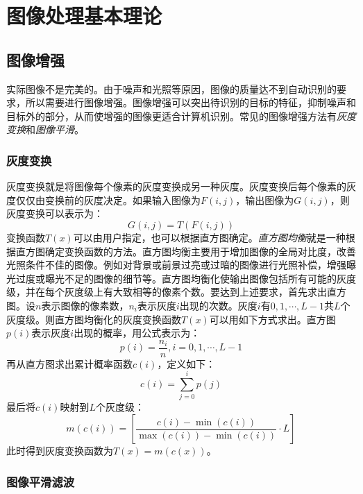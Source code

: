 
\chapter{图像处理基本理论}

\section{图像增强}

实际图像不是完美的。由于噪声和光照等原因，图像的质量达不到自动识别的要求，所以需要进行图像增强。图像增强可以突出待识别的目标的特征，抑制噪声和目标外的部分，从而使增强的图像更适合计算机识别。常见的图像增强方法有\emph{灰度变换}和\emph{图像平滑}。

\subsection{灰度变换}

灰度变换就是将图像每个像素的灰度变换成另一种灰度。灰度变换后每个像素的灰度仅仅由变换前的灰度决定。如果输入图像为$F(i,j)$，输出图像为$G(i,j)$，则灰度变换可以表示为：
\begin{equation}
  G(i,j)=T(F(i,j))
\end{equation}
变换函数$T(x)$可以由用户指定，也可以根据直方图确定。\emph{直方图均衡}就是一种根据直方图确定变换函数的方法。直方图均衡主要用于增加图像的全局对比度，改善光照条件不佳的图像。例如对背景或前景过亮或过暗的图像进行光照补偿，增强曝光过度或曝光不足的图像的细节等。直方图均衡化使输出图像包括所有可能的灰度级，并在每个灰度级上有大致相等的像素个数。要达到上述要求，首先求出直方图。设$n$表示图像的像素数，$n_i$表示灰度$i$出现的次数。灰度$i$有$0,1,\cdots,L-1$共$L$个灰度级。则直方图均衡化的灰度变换函数$T(x)$可以用如下方式求出。直方图$p(i)$表示灰度$i$出现的概率，用公式表示为：
\begin{equation}
  \label{eq:hist}
  p(i)=\frac{n_i}{n},i=0,1,\cdots,L-1
\end{equation}
再从直方图求出累计概率函数$c(i)$，定义如下：
\begin{equation}
  \label{eq:acc}
  c(i)=\sum_{j=0}^i p(j)
\end{equation}
最后将$c(i)$映射到$L$个灰度级：
\begin{equation}
  \label{eq:map}
  m(c(i))=\left[\frac{c(i)-\min(c(i))}{\max(c(i))-\min(c(i))}\cdot L\right]
\end{equation}
此时得到灰度变换函数为$T(x)=m(c(x))$。

\subsection{图像平滑滤波}

